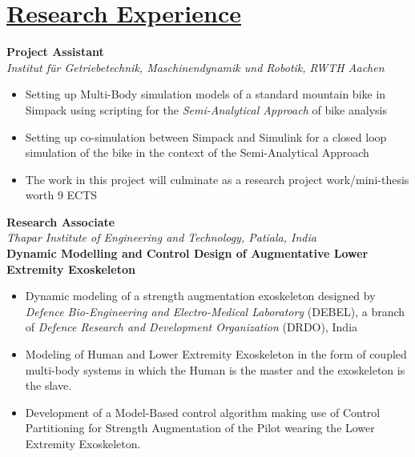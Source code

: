\section{\underline{Research Experience}}
\large{\textbf{Project Assistant}}
\hspace{4.1 in}
\minithesisdate\\
\textit{\large{Institut für Getriebetechnik, Maschinendynamik und Robotik, RWTH Aachen}}
\begin{itemize}
\item \large{Setting up Multi-Body simulation models of a standard mountain bike in Simpack using scripting for the \emph{Semi-Analytical Approach} of bike analysis}
\item\large{Setting up co-simulation between Simpack and Simulink for a closed loop simulation of the bike in the context of the Semi-Analytical Approach}
\item\large{The work in this project will culminate as a research project work/mini-thesis worth 9 ECTS}
\end{itemize}

\vspace{0.1 in}

\large{\textbf{Research Associate}}
\hspace{4.1 in}
\drdodate\\
\textit{\large{Thapar Institute of Engineering and Technology, Patiala, India}}\\
\textbf{Dynamic Modelling and Control Design of Augmentative Lower Extremity Exoskeleton}
\begin{itemize}
\item \large{Dynamic modeling of a strength augmentation exoskeleton designed by \emph{Defence Bio-Engineering and Electro-Medical Laboratory} (DEBEL), a branch of \emph{Defence Research and Development Organization} (DRDO), India}
\item\large{Modeling of Human and Lower Extremity Exoskeleton in the form of coupled multi-body systems in which the Human is the master and the exoskeleton is the slave.}
\item\large{Development of a Model-Based control algorithm making use of Control Partitioning for Strength Augmentation of the Pilot wearing the Lower Extremity Exoskeleton.}
\end{itemize}

